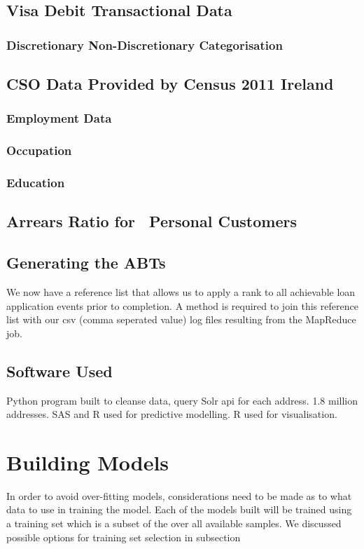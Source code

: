 \subsection{Visa Debit Transactional Data}
\subsubsection{Discretionary Non-Discretionary Categorisation}

\subsection{CSO Data Provided by Census 2011 Ireland}
\subsubsection{Employment Data}
\subsubsection{Occupation}
\subsubsection{Education}

\subsection{Arrears Ratio for \subjectname\ Personal Customers}

\subsection{Generating the ABTs}
We now have a reference list that allows us to apply a rank to all achievable loan application events prior to completion. A method is required to join this reference list with our csv (comma seperated value) log files resulting from the MapReduce job. 

\subsection{Software Used}\label{softwareUsed}
Python program built to cleanse data, query Solr api for each address. 1.8 million addresses.
SAS and R used for predictive modelling. R used for visualisation.


\section{Building Models}
In order to avoid over-fitting models, considerations need to be made as to what data to use in training the model. Each of the models built will be trained using a training set which is a subset of the over all available samples. We discussed possible options for training set selection in subsection


